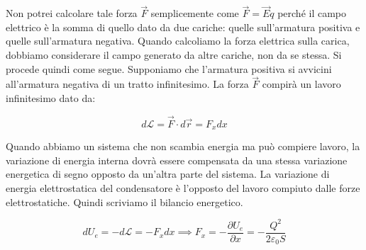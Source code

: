 \begin{figure}[htpb]
\end{figure}
\FloatBarrier

Non potrei calcolare tale forza $\vec{F}$ semplicemente come $\vec{F}=\vec{E}q$ perché il campo elettrico è la somma di quello dato da due cariche: quelle sull'armatura positiva e quelle sull'armatura negativa. Quando calcoliamo la forza elettrica sulla carica, dobbiamo considerare il campo generato da altre cariche, non da se stessa. Si procede quindi come segue.
Supponiamo che l'armatura positiva si avvicini all'armatura negativa
di un tratto infinitesimo. La forza $\vec{F}$ compirà un lavoro infinitesimo dato da:

\[
	d\mathcal{L} =\vec{F} \cdot d\vec{r} = F_x dx
\]

Quando abbiamo un sistema che non scambia energia ma può compiere lavoro, la variazione di energia interna dovrà essere compensata da una stessa variazione energetica di segno opposto da un'altra parte del sistema. La variazione di energia elettrostatica del condensatore è l'opposto del lavoro compiuto dalle forze elettrostatiche. Quindi scriviamo il bilancio energetico.

\[
	\boxed{dU_e = -d\mathcal{L}} = - F_xdx  \implies F_x = - \frac{\partial U_e}{\partial x} = - \frac{Q^2}{2\varepsilon_0 S}
\]

